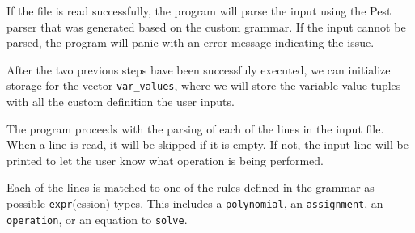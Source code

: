 If the file is read successfully, the program will parse the input using the Pest parser that was generated based on the custom grammar. If the input cannot be parsed, the program will panic with an error message indicating the issue.

After the two previous steps have been successfuly executed, we can initialize storage for the vector \verb|var_values|, where we will store the variable-value tuples with all the custom definition the user inputs.

The program proceeds with the parsing of each of the lines in the input file. When a line is read, it will be skipped if it is empty. If not, the input line will be printed to let the user know what operation is being performed.

Each of the lines is matched to one of the rules defined in the grammar as possible \verb|expr|(ession) types. This includes a \verb|polynomial|, an \verb|assignment|, an \verb|operation|, or an equation to \verb|solve|.

